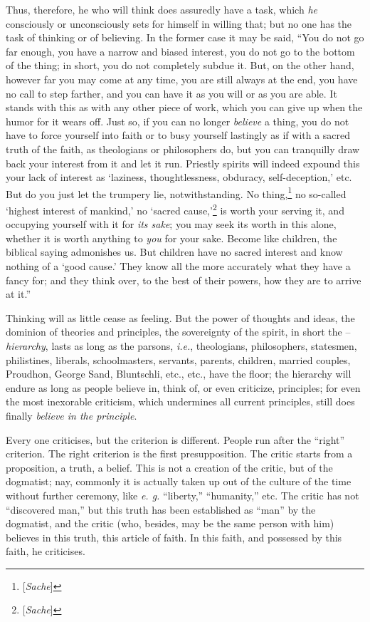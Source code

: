 \documentclass[12pt,a4paper]{book}
\begin{document}
Thus, therefore, he who will think does assuredly have a task, which 
\textit{he} consciously or unconsciously sets for himself in willing that; but 
no one has the task of thinking or of believing. In the former case it may be 
said, ``You do not go far enough, you have a narrow and biased interest, you 
do not go to the bottom of the thing; in short, you do not completely subdue 
it. But, on the other hand, however far you may come at any time, you are 
still always at the end, you have no call to step farther, and you can have it 
as you will or as you are able. It stands with this as with any other piece of 
work, which you can give up when the humor for it wears off. Just so, if you 
can no longer \textit{believe} a thing, you do not have to force yourself into 
faith or to busy yourself lastingly as if with a sacred truth of the faith, as 
theologians or philosophers do, but you can tranquilly draw back your interest 
from it and let it run. Priestly spirits will indeed expound this your lack of 
interest as `laziness, thoughtlessness, obduracy, self-deception,' etc. 
But do you just let the trumpery lie, notwithstanding. No 
thing,\footnote{[\textit{Sache}]} no so-called `highest interest of 
mankind,' no `sacred cause,'\footnote{[\textit{Sache}]} is worth your 
serving it, and occupying yourself with it for \textit{its sake}; you may seek 
its worth in this alone, whether it is worth anything to \textit{you} for your 
sake. Become like children, the biblical saying admonishes us. But children 
have no sacred interest and know nothing of a `good cause.' They know all 
the more accurately what they have a fancy for; and they think over, to the 
best of their powers, how they are to arrive at it.''

Thinking will as little cease as feeling. But the power of thoughts and ideas, 
the dominion of theories and principles, the sovereignty of the spirit, in 
short the -- \textit{hierarchy}, lasts as long as the parsons, \textit{i.e.}, 
theologians, philosophers, statesmen, philistines, liberals, schoolmasters, 
servants, parents, children, married couples, Proudhon, George Sand, 
Bluntschli, etc., etc., have the floor; the hierarchy will endure as long as 
people believe in, think of, or even criticize, principles; for even the most 
inexorable criticism, which undermines all current principles, still does 
finally \textit{believe in the principle}.

Every one criticises, but the criterion is different. People run after the 
``right'' criterion. The right criterion is the first presupposition. The 
critic starts from a proposition, a truth, a belief. This is not a creation of 
the critic, but of the dogmatist; nay, commonly it is actually taken up out of 
the culture of the time without further ceremony, like \textit{e. g.} 
``liberty,'' ``humanity,'' etc. The critic has not ``discovered man,'' 
but this truth has been established as ``man'' by the dogmatist, and the 
critic (who, besides, may be the same person with him) believes in this truth, 
this article of faith. In this faith, and possessed by this faith, he 
criticises.
\end{document}

